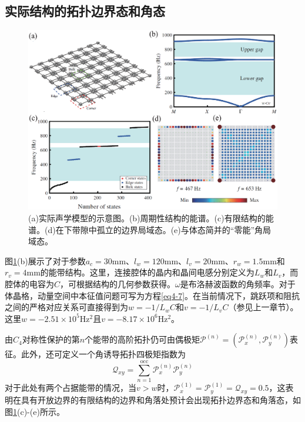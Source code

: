 \subsection{实际结构的拓扑边界态和角态}

\begin{figure}[h!]
    \centering
    \includegraphics[width=1\textwidth]{images/fig4-2.eps} 
    \caption{(a)实际声学模型的示意图。(b)周期性结构的能谱。(c)有限结构的能谱。(d)在下带隙中孤立的边界局域态。(e)与体态简并的“零能”角局域态。}
    \label{fig_4_2}
  \end{figure}  

图\ref{fig_4_2}(b)展示了对于参数$a_c = 30$mm、$l_w = 120$mm、$l_v = 20$mm、$r_w = 1.5$mm和$r_v = 4$mm的能带结构。这里，连接腔体的晶内和晶间电感分别定义为$L_w$和$L_v$，而腔体的电容为$C$，可根据结构的几何参数获得。$\omega$是布洛赫波函数的角频率。对于体晶格，动量空间中本征值问题可写为方程\ref{eq4-7}。在当前情况下，跳跃项和阻抗之间的严格对应关系可直接得到为$w = -1/L_wC$和$v = -1/L_vC$（参见上一章节）。这里$w = -2.51\times 10^5$Hz$^2$且$v = -8.17\times 10^6$Hz$^2$。

由$C_4$对称性保护的第$n$个能带的高阶拓扑仍可由偶极矩$\mathcal{P}^{(n)} = (\mathcal{P}_x^{(n)}, \mathcal{P}_y^{(n)})$表征。此外，还可定义一个角诱导拓扑四极矩指数为\cite{C45-3}
\begin{equation}
    \mathcal{Q}_{xy} = \sum_{n = 1}^{\text{occ}} \mathcal{P}_x^{(n)} \mathcal{P}_y^{(n)}
    \label{eq4-14}
\end{equation}
对于此处有两个占据能带的情况，当$v > w$时，$\mathcal{P}_x^{(1)} = \mathcal{P}_y^{(1)} = \mathcal{Q}_{xy} = 0.5$，这表明在具有开放边界的有限结构的边界和角落处预计会出现拓扑边界态和角落态，如图\ref{fig_4_2}(c)-(e)所示。

